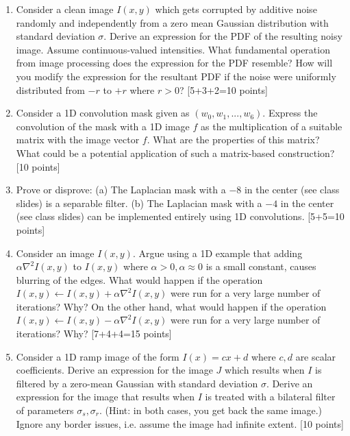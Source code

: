 \documentclass[11pt]{article}
\begin{document}
\begin{enumerate}
\item Consider a clean image $I(x,y)$ which gets corrupted by additive noise randomly and independently from a zero mean Gaussian distribution with standard deviation $\sigma$. Derive an expression for the PDF of the resulting noisy image. Assume continuous-valued intensities. What fundamental operation from image processing does the expression for the PDF resemble? How will you modify the expression for the resultant PDF if the noise were uniformly distributed from $-r$ to $+r$ where $r > 0$?  \textsf{[5+3+2=10 points]}

\item Consider a 1D convolution mask given as $(w_0, w_1,..., w_6)$. Express the convolution of the mask with a 1D image $f$ as the multiplication of a suitable matrix with the image vector $f$. What are the properties of this matrix? What could be a potential application of such a matrix-based construction? \textsf{[10 points]}

\item Prove or disprove: (a) The Laplacian mask with a $-8$ in the center (see class slides) is a separable filter. (b) The Laplacian mask with a $-4$ in the center (see class slides) can be implemented entirely using 1D convolutions. \textsf{[5+5=10 points]}

\item Consider an image $I(x,y)$. Argue using a 1D example that adding $\alpha \nabla^2 I(x,y)$ to $I(x,y)$ where $\alpha > 0, \alpha \approx 0$ is a small constant, causes blurring of the edges. What would happen if the operation $I(x,y) \leftarrow I(x,y) + \alpha \nabla^2 I(x,y)$ were run for a very large number of iterations? Why? On the other hand, what would happen if the operation  $I(x,y) \leftarrow I(x,y) - \alpha \nabla^2 I(x,y)$ were run for a very large number of iterations? Why? \textsf{[7+4+4=15 points]}

\item Consider a 1D ramp image of the form $I(x) = cx + d$ where $c,d$ are scalar coefficients. Derive an expression for the image $J$ which results when $I$ is filtered by a zero-mean Gaussian with standard deviation $\sigma$. Derive an expression for the image that results when $I$ is treated with a bilateral filter of parameters $\sigma_s, \sigma_r$. (Hint: in both cases, you get back the same image.) Ignore any border issues, i.e. assume the image had infinite extent. \textsf{[10 points]}


\end{enumerate}
\end{document}
